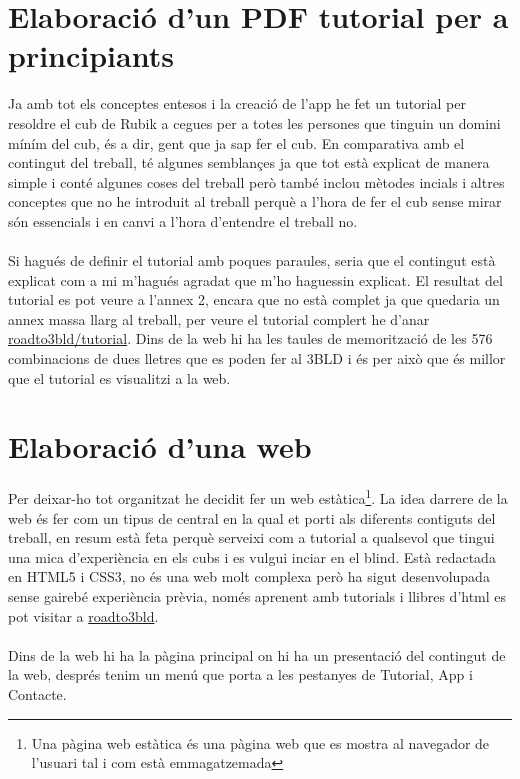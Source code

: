 \chapter{Elaboració d'un PDF tutorial per a principiants}

Ja amb tot els conceptes entesos i la creació de l'app he fet un tutorial per resoldre el cub de Rubik a cegues per a totes les persones que tinguin un domini míním del cub, és a dir, gent que ja sap fer el cub. 
En comparativa amb el contingut del treball, té algunes semblançes ja que tot està explicat de manera simple i conté algunes coses del treball però també inclou mètodes incials i altres conceptes que no he introduit al treball perquè a l'hora de fer el cub sense mirar són essencials i en canvi a l'hora d'entendre el treball no.
\\\\Si hagués de definir el tutorial amb poques paraules, seria que el contingut està explicat com a mi m'hagués agradat que m'ho haguessin explicat. El resultat del tutorial es pot veure a l'annex 2, encara que no està complet ja que quedaria un annex massa llarg al treball, per veure el tutorial complert he d'anar \href{https://polsances13.github.io/roadto3bld/Tutorial.html}{roadto3bld/tutorial}. Dins de la web hi ha les taules de memorització de les 576 combinacions de dues lletres que es poden fer al 3BLD i és per això que és millor que el tutorial es visualitzi a la web.




\chapter{Elaboració d'una web}

Per deixar-ho tot organitzat he decidit fer un web estàtica\footnote{Una pàgina web estàtica és una pàgina web que es mostra al navegador de l'usuari tal i com està emmagatzemada}. La idea darrere de la web és fer com un tipus de central en la qual et porti als diferents contiguts del treball, en resum està feta perquè serveixi com a tutorial a qualsevol que tingui una mica d'experiència en els cubs i es vulgui inciar en el blind.
Està redactada en HTML5 i CSS3, no és una web molt complexa però ha sigut desenvolupada sense gairebé experiència prèvia, només aprenent amb tutorials i llibres d'html es pot visitar a \href{https://polsances13.github.io/roadto3bld/index.html}{roadto3bld}.
\\\\Dins de la web hi ha la pàgina principal on hi ha un presentació del contingut de la web, després tenim un menú que porta a les pestanyes de Tutorial, App i Contacte. 

